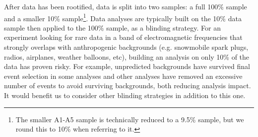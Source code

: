        After data has been rootified, data is split into two samples: a full 100\% sample and a smaller 10\% sample\footnote{
            The smaller A1-A5 sample is technically reduced to a 9.5\% sample, but we round this to 10\% when referring to it.
        }. 
        Data analyses are typically built on the 10\% data sample then applied to the 100\% sample, as a blinding strategy. 
        For an experiment looking for rare data in a band of electromagnetic frequencies that strongly overlaps with anthropogenic backgrounds (e.g. snowmobile spark plugs, radios, airplanes, weather balloons, etc), building an analysis on only 10\% of the data has proven risky. 
        For example, unpredicted backgrounds have survived final event selection in some analyses and other analyses have removed an excessive number of events to avoid surviving backgrounds, both reducing analysis impact. 
        It would benefit us to consider other blinding strategies in addition to this one.

